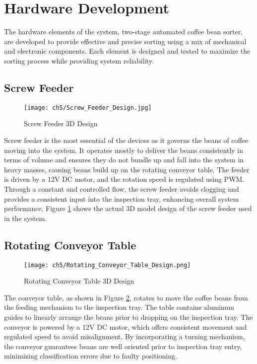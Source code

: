 \section{Hardware Development}
The hardware elements of the system, two-stage automated coffee bean sorter, are developed to provide effective and precise sorting using a mix of mechanical and electronic components. Each element is designed and tested to maximize the sorting process while providing system reliability.

\subsection{Screw Feeder}
\begin{figure}[H]
    \centering
    \texttt{[image: ch5/Screw\_Feeder\_Design.jpg]}
    \caption{Screw Feeder 3D Design}
    \label{fig:screw_feeder}
\end{figure}
Screw feeder is the most essential of the devices as it governs the beans of coffee moving into the system. It operates mostly to deliver the beans consistently in terms of volume and ensures they do not bundle up and fall into the system in heavy masses, causing beans build up on the rotating conveyor table. The feeder is driven by a 12V DC motor, and the rotation speed is regulated using PWM. Through a constant and controlled flow, the screw feeder avoids clogging and provides a consistent input into the inspection tray, enhancing overall system performance. Figure \ref{fig:screw_feeder} shows the actual 3D model design of the screw feeder used in the system. 

\subsection{Rotating Conveyor Table}
\begin{figure}[H]
    \centering
    \texttt{[image: ch5/Rotating\_Conveyor\_Table\_Design.png]}
    \caption{Rotating Conveyor Table 3D Design}
    \label{fig:rotating_conveyor}
\end{figure}
The conveyor table, as shown in Figure \ref{fig:rotating_conveyor}, rotates to move the coffee beans from the feeding mechanism to the inspection tray. The table contains aluminum guides to linearly arrange the beans prior to dropping on the inspection tray. The conveyor is powered by a 12V DC motor, which offers consistent movement and regulated speed to avoid misalignment. By incorporating a turning mechanism, the conveyor guarantees beans are well oriented prior to inspection tray entry, minimizing classification errors due to faulty positioning.

